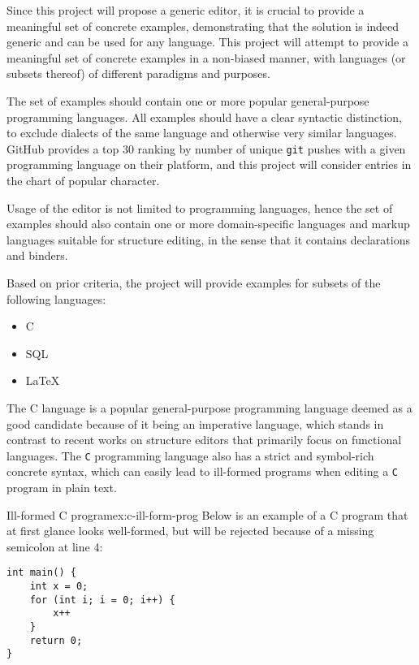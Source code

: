 Since this project will propose a generic editor, it is crucial to provide a meaningful set of concrete examples, demonstrating that the solution is indeed generic and can be used for any language.
This project will attempt to provide a meaningful set of concrete examples in a non-biased manner, with languages (or subsets thereof) of different paradigms and purposes.

The set of examples should contain one or more popular general-purpose programming languages.
All examples should have a clear syntactic distinction, to exclude dialects of the same language and otherwise very similar languages. \\ GitHub provides a top 30 ranking\cite{prog-lang-metrics} by number of unique \texttt{git} pushes with a given programming language on their platform, and this project will consider entries in the chart of popular character.

Usage of the editor is not limited to programming languages, hence the set of examples should also contain one or more domain-specific languages and markup languages suitable for structure editing, in the sense that it contains declarations and binders.

Based on prior criteria, the project will provide examples for subsets of the following languages:
\begin{itemize}
    \item C
    \item SQL
    \item \LaTeX
\end{itemize}

The C language\cite{c-iso-standard} is a popular general-purpose programming language deemed as a good candidate because of it being an imperative language, which stands in contrast to recent works on structure editors\cite{aalborg}\cite{godiksen}\cite{omar} that primarily focus on functional languages. The \texttt{C} programming language also has a strict and symbol-rich concrete syntax, which can easily lead to ill-formed programs when editing a \texttt{C} program in plain text.

\begin{example}{Ill-formed C program}{ex:c-ill-form-prog}
    Below is an example of a C program that at first glance looks well-formed, but will be rejected because of a missing semicolon at line 4:
    \begin{lstlisting}
int main() {
    int x = 0;
    for (int i; i = 0; i++) {
        x++
    }
    return 0;
}
    \end{lstlisting}
\end{example}

